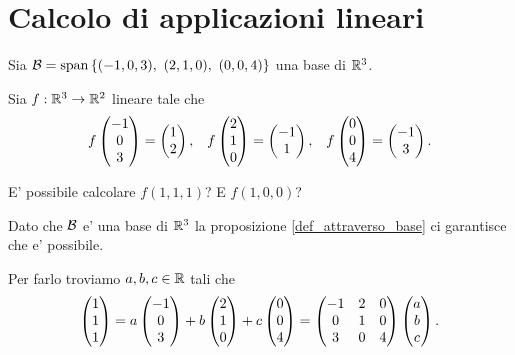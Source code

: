 \section{Calcolo di applicazioni lineari}

\begin{example}
    Sia $\BB = \Span{(-1,0,3),\ (2, 1, 0),\ (0, 0, 4)}$ una base di $\R^3$. 
    
    Sia $f : \R^3 \to \R^2$ lineare tale che \begin{align*}
        f\mat{-1\\0\\3} = \mat{1\\2}, &&f\mat{2\\ 1\\ 0} = \mat{-1\\1}, &&f\mat{0\\0\\4} = \mat{-1\\3}.
    \end{align*}

    E' possibile calcolare $f(1, 1, 1)$? E $f(1, 0, 0)$?

    Dato che $\BB$ e' una base di $\R^3$ la proposizione \ref{def_attraverso_base} ci garantisce che e' possibile.

    Per farlo troviamo $a, b, c \in \R$ tali che \[
        \mat{1\\1\\1} = a\mat{-1\\0\\3} + b\mat{2 \\1\\0} + c\mat{0\\0\\4} = \mat{-1&2&0\\0&1&0\\3&0&4}\mat{a\\b\\c}.
    \]


\end{example}

